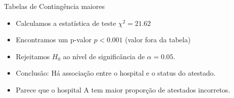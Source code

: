 \documentclass{beamer}
\begin{document}
\begin{frame}{Tabelas de Contingência maiores}
  \begin{itemize}
  \item Calculamos a estatística de teste $\chi^2 = 21.62$
  \item Encontramos um p-valor $p<0.001$ (valor fora da tabela)
  \item Rejeitamos $H_0$ ao nível de significância de $\alpha = 0.05$.
  \item Conclusão: Há associação entre o hospital e o status do atestado.
  \item Parece que o hospital A tem maior proporção de atestados incorretos.
  \end{itemize}
\end{frame}







\end{document}
